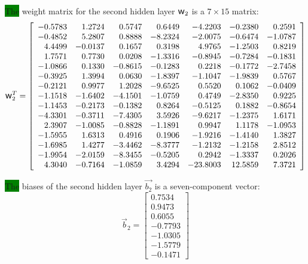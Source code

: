 \documentclass[metals,article,accept,pdftex,moreauthors]{Definitions/mdpi}
\DeclareRobustCommand{\w}{\mbox{\large\ensuremath{\mathsf{w}}}}
\newcommand{\hlok}[1]{\colorbox{green}{#1}}
\begin{document}
\hlok{The} weight matrix for the second hidden layer $\w_2$ is a $7\times15$ matrix:
\begin{equation*}
\w_2^T = \left[
\begin{array}{rrrrrrr}
-0.5783 & 1.2724 & 0.5747 & 0.6449 & -4.2203 & -0.2380 & 0.2591 \\
-0.4852 & 5.2807 & 0.8888 & -8.2324 & -2.0075 & -0.6474 & -1.0787 \\
4.4499 & -0.0137 & 0.1657 & 0.3198 & 4.9765 & -1.2503 & 0.8219 \\
1.7571 & 0.7730 & 0.0208 & -1.3316 & -0.8945 & -0.7284 & -0.1831 \\
-1.0866 & 0.1330 & -0.8615 & -0.1283 & 0.2218 & -0.1772 & -2.7458 \\
-0.3925 & 1.3994 & 0.0630 & -1.8397 & -1.1047 & -1.9839 & 0.5767 \\
-0.2121 & 0.9977 & 1.2028 & -9.6525 & 0.5520 & 0.1062 & -0.0409 \\
-1.1518 & -1.6402 & -4.1501 & -1.0759 & 0.4749 & -2.8350 & 0.9225 \\
-1.1453 & -0.2173 & -0.1382 & 0.8264 & -0.5125 & 0.1882 & -0.8654 \\
-4.3301 & -0.3711 & -7.4305 & 3.5926 & -9.6217 & -1.2375 & 1.6171 \\
2.3907 & -1.0085 & -0.8828 & -1.1891 & 0.9947 & 1.1178 & -1.0953 \\
-1.5955 & 1.6313 & 0.4916 & 0.1906 & -1.9216 & -1.4140 & 1.3827 \\
-1.6985 & 1.4277 & -3.4462 & -8.3777 & -1.2132 & -1.2158 & 2.8512 \\
-1.9954 & -2.0159 & -8.3455 & -0.5205 & 0.2942 & -1.3337 & 0.2026 \\
4.3040 & -0.7164 & -1.0859 & 3.4294 & -23.8003 & 12.5859 & 7.3721
\end{array}\right]
\end{equation*}

\hlok{The} biases of the second hidden layer $\overrightarrow{b_2}$ is a seven-component vector:
\begin{equation*}
\overrightarrow{b}_2 = \left[
\begin{array}{r}
0.7534 \\
0.9473 \\
0.6055 \\
-0.7793 \\
-1.0305 \\
-1.5779 \\
-0.1471
\end{array}\right]
\end{equation*}
\end{document}
